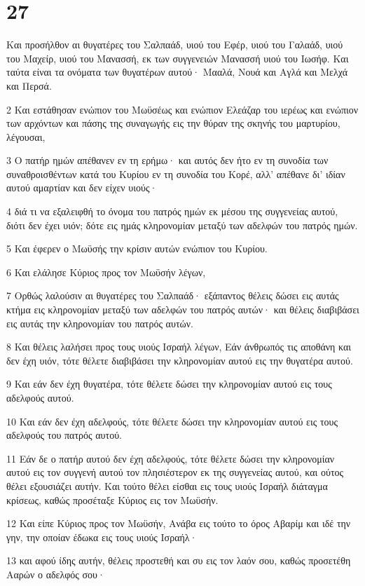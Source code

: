 \chapter{27}

\par Και προσήλθον αι θυγατέρες του Σαλπαάδ, υιού του Εφέρ, υιού του Γαλαάδ, υιού του Μαχείρ, υιού του Μανασσή, εκ των συγγενειών Μανασσή υιού του Ιωσήφ. Και ταύτα είναι τα ονόματα των θυγατέρων αυτού· Μααλά, Νουά και Αγλά και Μελχά και Περσά.
\par 2 Και εστάθησαν ενώπιον του Μωϋσέως και ενώπιον Ελεάζαρ του ιερέως και ενώπιον των αρχόντων και πάσης της συναγωγής εις την θύραν της σκηνής του μαρτυρίου, λέγουσαι,
\par 3 Ο πατήρ ημών απέθανεν εν τη ερήμω· και αυτός δεν ήτο εν τη συνοδία των συναθροισθέντων κατά του Κυρίου εν τη συνοδία του Κορέ, αλλ' απέθανε δι' ιδίαν αυτού αμαρτίαν και δεν είχεν υιούς·
\par 4 διά τι να εξαλειφθή το όνομα του πατρός ημών εκ μέσου της συγγενείας αυτού, διότι δεν έχει υιόν; δότε εις ημάς κληρονομίαν μεταξύ των αδελφών του πατρός ημών.
\par 5 Και έφερεν ο Μωϋσής την κρίσιν αυτών ενώπιον του Κυρίου.
\par 6 Και ελάλησε Κύριος προς τον Μωϋσήν λέγων,
\par 7 Ορθώς λαλούσιν αι θυγατέρες του Σαλπαάδ· εξάπαντος θέλεις δώσει εις αυτάς κτήμα εις κληρονομίαν μεταξύ των αδελφών του πατρός αυτών· και θέλεις διαβιβάσει εις αυτάς την κληρονομίαν του πατρός αυτών.
\par 8 Και θέλεις λαλήσει προς τους υιούς Ισραήλ λέγων, Εάν άνθρωπός τις αποθάνη και δεν έχη υιόν, τότε θέλετε διαβιβάσει την κληρονομίαν αυτού εις την θυγατέρα αυτού.
\par 9 Και εάν δεν έχη θυγατέρα, τότε θέλετε δώσει την κληρονομίαν αυτού εις τους αδελφούς αυτού.
\par 10 Και εάν δεν έχη αδελφούς, τότε θέλετε δώσει την κληρονομίαν αυτού εις τους αδελφούς του πατρός αυτού.
\par 11 Εάν δε ο πατήρ αυτού δεν έχη αδελφούς, τότε θέλετε δώσει την κληρονομίαν αυτού εις τον συγγενή αυτού τον πλησιέστερον εκ της συγγενείας αυτού, και ούτος θέλει εξουσιάζει αυτήν. Και τούτο θέλει είσθαι εις τους υιούς Ισραήλ διάταγμα κρίσεως, καθώς προσέταξε Κύριος εις τον Μωϋσήν.
\par 12 Και είπε Κύριος προς τον Μωϋσήν, Ανάβα εις τούτο το όρος Αβαρίμ και ιδέ την γην, την οποίαν έδωκα εις τους υιούς Ισραήλ·
\par 13 και αφού ίδης αυτήν, θέλεις προστεθή και συ εις τον λαόν σου, καθώς προσετέθη Ααρών ο αδελφός σου·
